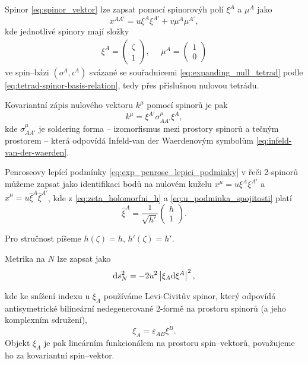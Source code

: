 Spinor \eqref{eq:spinor_vektor} lze zapsat pomocí spinorovýh polí $\xi^A$ a $\mu^A$ jako
\begin{equation}
    \label{eq:spinor_position}
    x^{AA'} = u \xi^A \xi^{A'} + v \mu^A \mu^{A'},
\end{equation}
kde jednotlivé spinory mají složky
\begin{align}
    \label{eq:xi_mu_explicitne_v_bazi}
    \xi^A = \begin{pmatrix}
        \zeta \\ 1
    \end{pmatrix}, ~~~~~~ \mu^A = \begin{pmatrix}
        1 \\ 0
    \end{pmatrix}
\end{align}
ve spin--bázi $(o^A, \iota^A)$ svázané se souřadnicemi \eqref{eq:expanding_null_tetrad} podle \eqref{eq:tetrad-spinor-basis-relation}, tedy
přes příslušnou nulovou tetrádu.

Kovariantní zápis nulového vektoru $k^\mu$ pomocí spinorů je pak
\begin{equation}
    k^\mu = \xi^{A'} \sigma^\mu_{AA'} \xi^{A},
\end{equation}
kde $\sigma^\mu_{AA'}$ je soldering forma -- izomorfismus mezi prostory spinorů a tečným prostorem -- která
odpovídá Infeld-van der Waerdenovým symbolům \eqref{eq:infeld-van-der-waerden}.

Penroseovy lepící podmínky \eqref{eq:exp_penrose_lepici_podminky} v řeči 2-spinorů můžeme zapsat jako
identifikaci bodů na nulovém kuželu $x^\mu = u \xi^A \xi^{A'}$ a $\hat{x}^\mu = u \hat{\xi}^A \hat{\xi}^{A'}$,
kde z \eqref{eq:zeta_holomorfni_h} a \eqref{eq:u_podminka_spojitosti} platí
\begin{equation}
    \label{eq:xi_transformace}
    \hat{\xi}^A = \frac{1}{\sqrt{h'}} \begin{pmatrix}
        h \\ 1
    \end{pmatrix}.
\end{equation}

Pro stručnost píšeme $h(\zeta) = h$, $h'(\zeta) = h'$.

Metrika na $N$ lze zapsat jako
\begin{equation}
    \mathrm{d} s_N^2 = - 2 u^2 \left| \xi_A \mathrm{d} \xi^A \right|^2,
\end{equation}

kde ke snížení indexu u $\xi_A$ používáme Levi-Civitův spinor, který odpovídá
antisymetrické bilineární nedegenerované 2-formě na prostoru spinorů (a jeho komplexním sdružení),
\begin{equation}
    \xi_A = \varepsilon_{AB} \xi^B.
\end{equation}
Objekt $\xi_A$ je pak lineárním funkcionálem na prostoru spin--vektorů, považujeme ho za kovariantní spin--vektor.

